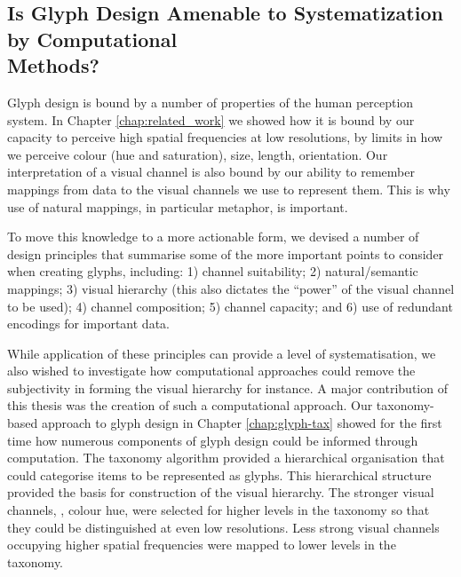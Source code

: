 
\subsection{Is Glyph Design Amenable to Systematization by Computational \\Methods?}
Glyph design is bound by a number of properties of the human perception system.
In Chapter \ref{chap:related_work} we showed how it is bound by our capacity to perceive high spatial frequencies at low resolutions, by limits in how we perceive colour (hue and saturation), size, length, orientation.
Our interpretation of a visual channel is also bound by our ability to remember mappings from data to the visual channels we use to represent them.
This is why use of natural mappings, in particular metaphor, is important.

To move this knowledge to a more actionable form, we devised a number of design principles that summarise some of the more important points to consider when creating glyphs, including:
1) channel suitability;
2) natural/semantic mappings;
3) visual hierarchy (this also dictates the ``power'' of the visual channel to be used);
4) channel composition;
5) channel capacity; and
6) use of redundant encodings for important data.

While application of these principles can provide a level of systematisation, we also wished to investigate how computational approaches could remove the subjectivity in forming the visual hierarchy for instance.
A major contribution of this thesis was the creation of such a computational approach.
Our taxonomy-based approach to glyph design in Chapter \ref{chap:glyph-tax} showed for the first time how numerous components of glyph design could be informed through computation.
The taxonomy algorithm provided a hierarchical organisation that could categorise items to be represented as glyphs.
This hierarchical structure provided the basis for construction of the visual hierarchy.
The stronger visual channels, \eg, colour hue, were selected for higher levels in the taxonomy so that they could be distinguished at even low resolutions.
Less strong visual channels occupying higher spatial frequencies were mapped to lower levels in the taxonomy.

